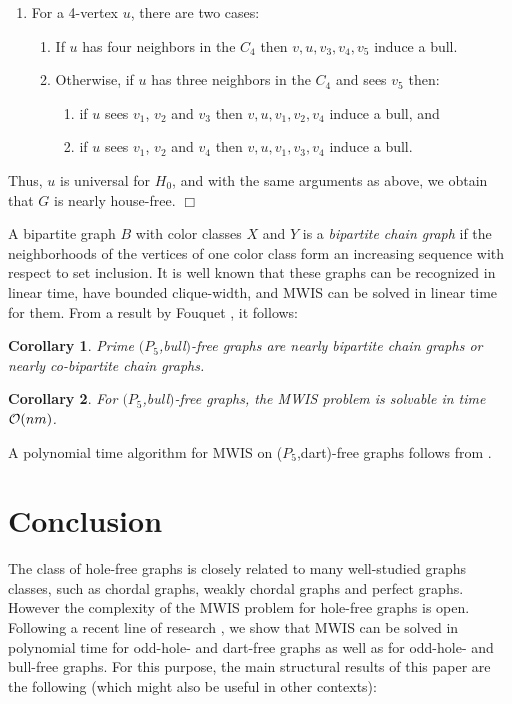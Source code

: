 \documentclass[11pt]{article}
\newcommand{\qed}{\hfill $\Box$}
\newcommand{\0}{\text{ has a co-join to }}
\newcommand{\1}{\text{ has a join to }}
\newtheorem{coro}{Corollary}
\begin{document}
\begin{enumerate}
\item For a 4-vertex $u$, there are two cases: 

\begin{enumerate}
\item If $u$ has four neighbors in the $C_4$ then $v,u,v_3,v_4,v_5$ induce a bull. 

\item Otherwise, if $u$ has three neighbors in the $C_4$ and sees $v_5$ then:
\begin{enumerate}
\item if $u$ sees $v_1$, $v_2$ and $v_3$ then $v,u,v_1,v_2,v_4$ induce a bull, and  
\item if $u$ sees $v_1$, $v_2$ and $v_4$ then $v,u,v_1,v_3,v_4$ induce a bull.      
\end{enumerate}
\end{enumerate} 
 
\end{enumerate}
 
Thus, $u$ is universal for $H_0$, and with the same arguments as above, we obtain that $G$ is nearly house-free.
\qed  

\medskip

A bipartite graph $B$ with color classes $X$ and $Y$ is a {\em bipartite chain graph} if the neighborhoods of the vertices of one color class form an increasing sequence with respect to set inclusion. It is well known that these graphs can be recognized in linear time, have bounded clique-width, and MWIS can be solved in linear time for them. From a result by Fouquet \cite{Fouqu1993}, it follows: 
 
\begin{coro}\label{P5bullfrnearlychain}
Prime $(P_5$,bull$)$-free graphs are nearly bipartite chain graphs or nearly co-bipartite chain graphs. 
\end{coro}

\begin{coro}\label{P5bullfrMWIS}
For $(P_5$,bull$)$-free graphs, the MWIS problem is solvable in time ${\cal O}(n m)$. 
\end{coro}

A polynomial time algorithm for MWIS on ($P_5$,dart)-free graphs follows from \cite{Mosca2004}. 

\section{Conclusion}

The class of hole-free graphs is closely related to many well-studied graphs classes, such as chordal graphs, weakly chordal graphs and perfect graphs. However the complexity of the MWIS problem for hole-free graphs is open. Following a recent line of research \cite{BraGia2012,BraGiaMaf2012}, we show that MWIS can be solved in polynomial time for odd-hole- and dart-free graphs as well as for odd-hole- and bull-free graphs. For this purpose, the main structural results of this paper are the following (which might also be useful in other contexts):  
\end{document}
